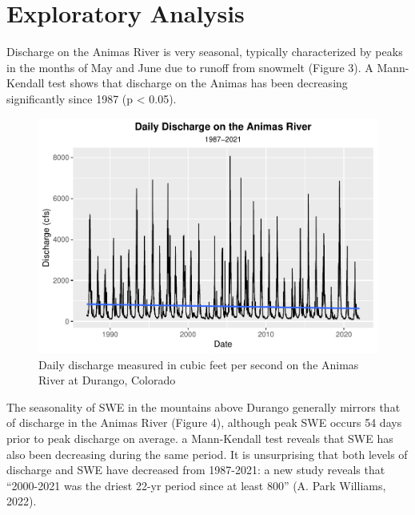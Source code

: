 \documentclass[
  12pt,
]{article}
\begin{document}
\newpage

\hypertarget{exploratory-analysis}{%
\section{Exploratory Analysis}\label{exploratory-analysis}}

Discharge on the Animas River is very seasonal, typically characterized
by peaks in the months of May and June due to runoff from snowmelt
(Figure 3). A Mann-Kendall test shows that discharge on the Animas has
been decreasing significantly since 1987 (p \textless{} 0.05).

\begin{figure}
\centering
\includegraphics{McLaughlin_WDA_Project_files/figure-latex/unnamed-chunk-2-1.pdf}
\caption{Daily discharge measured in cubic feet per second on the Animas
River at Durango, Colorado}
\end{figure}

\newpage

The seasonality of SWE in the mountains above Durango generally mirrors
that of discharge in the Animas River (Figure 4), although peak SWE
occurs 54 days prior to peak discharge on average. a Mann-Kendall test
reveals that SWE has also been decreasing during the same period. It is
unsurprising that both levels of discharge and SWE have decreased from
1987-2021: a new study reveals that ``2000-2021 was the driest 22-yr
period since at least 800'' (A. Park Williams, 2022).
\end{document}
